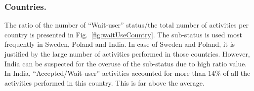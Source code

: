 \documentclass[lnbip]{svmultln}
\begin{document}


\subsubsection{Countries.} 
%
%

The ratio of the number of ``Wait-user'' status/the total number of activities per country is presented in Fig.~\ref{fig:waitUseCountry}. The sub-status is used most frequently in Sweden, Poland and India. In case of Sweden and Poland, it is justified by the large number of activities performed in those countries. However, India can be suspected for the overuse of the sub-status due to high ratio value. In India, ``Accepted/Wait-user'' activities accounted for more than 14\% of all the activities performed in this country. This is far above the average.

%
%
 
\end{document}
